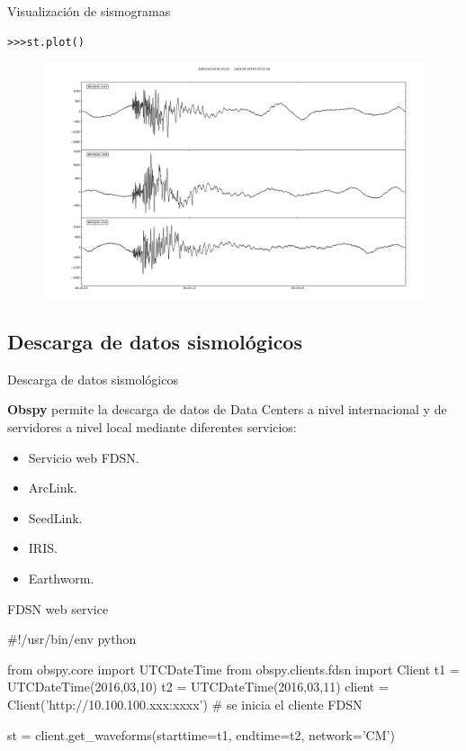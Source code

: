 \documentclass[11pt]{beamer}
\begin{document}
\begin{frame}[fragile]{Visualización de sismogramas}
\begin{verbatim}
>>>st.plot()
\end{verbatim}
\begin{figure}
\includegraphics[scale=0.2]{traza.png}
\end{figure}
\end{frame}

\subsection{Descarga de datos sismológicos}
\begin{frame}[fragile]{Descarga de datos sismológicos}

\textbf{Obspy} permite la descarga de datos de Data Centers a nivel internacional y de servidores a nivel local mediante diferentes servicios:
\begin{itemize}
\item Servicio web FDSN.\\
\pause
\item ArcLink.\\
\pause
\item SeedLink.\\
\pause
\item IRIS.\\
\pause
\item Earthworm.\\
\end{itemize}

\end{frame}

\begin{frame}[fragile]{FDSN web service}
\begin{pythoncode}
#!/usr/bin/env python

from obspy.core import UTCDateTime
from obspy.clients.fdsn import Client
t1 = UTCDateTime(2016,03,10)
t2 = UTCDateTime(2016,03,11)
client = Client('http://10.100.100.xxx:xxxx') # se inicia el cliente FDSN

st = client.get_waveforms(starttime=t1, endtime=t2, network='CM')
\end{pythoncode}
\end{frame}
\end{document}
